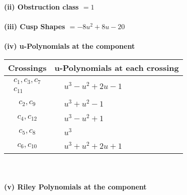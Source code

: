 \documentclass[1p]{elsarticle_modified}
\theoremstyle{definition}
\begin{document}
\flushleft \textbf{(ii) Obstruction class $= 1$}\\~\\
\flushleft \textbf{(iii) Cusp Shapes $= -8 u^2+8 u-20$}\\~\\
\newpage\renewcommand{\arraystretch}{1}
\flushleft \textbf{(iv) u-Polynomials at the component}\newline \\
\begin{tabular}{m{50pt}|m{274pt}}
Crossings & \hspace{64pt}u-Polynomials at each crossing \\
\hline $$\begin{aligned}c_{1},c_{3},c_{7}\\c_{11}\end{aligned}$$&$\begin{aligned}
&u^3- u^2+2 u-1
\end{aligned}$\\
\hline $$\begin{aligned}c_{2},c_{9}\end{aligned}$$&$\begin{aligned}
&u^3+u^2-1
\end{aligned}$\\
\hline $$\begin{aligned}c_{4},c_{12}\end{aligned}$$&$\begin{aligned}
&u^3- u^2+1
\end{aligned}$\\
\hline $$\begin{aligned}c_{5},c_{8}\end{aligned}$$&$\begin{aligned}
&u^3
\end{aligned}$\\
\hline $$\begin{aligned}c_{6},c_{10}\end{aligned}$$&$\begin{aligned}
&u^3+u^2+2 u+1
\end{aligned}$\\
\hline
\end{tabular}\\~\\
\newpage\renewcommand{\arraystretch}{1}
\flushleft \textbf{(v) Riley Polynomials at the component}\newline \\
\end{document}
